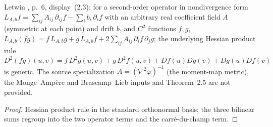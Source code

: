 \begin{lemma}
  \label{lem:letwin-diffusion-product-rule}
  \leanok
  Letwin \cite{Letwin2026QuadraticKLS}, p.~6, display~(2.3): for a second-order operator in
  nondivergence form $L_{A,b}f=\sum_{ij}A_{ij}\,\partial_{ij}f-\sum_i b_i\,\partial_if$ with an arbitrary
  real coefficient field $A$ (symmetric at each point) and drift $b$, and $C^2$ functions $f,g$,
  $L_{A,b}(fg)=f\,L_{A,b}g+g\,L_{A,b}f+2\sum_{ij}A_{ij}\,\partial_if\,\partial_jg$; the underlying Hessian
  product rule $D^2(fg)(u,v)=f\,D^2g(u,v)+g\,D^2f(u,v)+Df(u)Dg(v)+Dg(u)Df(v)$ is generic.  The source
  specialization $A=(\nabla^2\varphi)^{-1}$ (the moment-map metric), the Monge--Amp\`ere and Brascamp--Lieb
  inputs and Theorem~2.5 are not provided.
\end{lemma}
\begin{proof}
  \leanok
  Hessian product rule in the standard orthonormal basis; the three bilinear sums regroup into the
  two operator terms and the carr\'e-du-champ term.
\end{proof}

